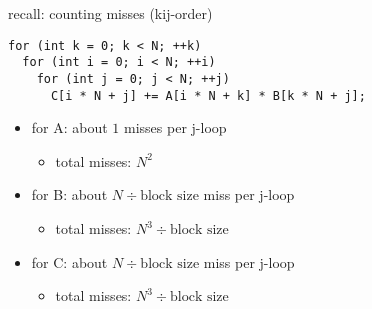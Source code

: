 
\begin{frame}[fragile,label=countingMissesKIJ]{recall: counting misses (kij-order)}
\lstset{style=smaller,language=C++}
\begin{lstlisting}
for (int k = 0; k < N; ++k)
  for (int i = 0; i < N; ++i)
    for (int j = 0; j < N; ++j)
      C[i * N + j] += A[i * N + k] * B[k * N + j];
\end{lstlisting}
\begin{itemize}
\item for A: about $1$ misses per j-loop
    \begin{itemize}
    \item total misses: $N^2$
    \end{itemize}
\item for B: about $N\div\text{block size}$ miss per j-loop
    \begin{itemize}
    \item total misses: $N^3\div\text{block size}$
    \end{itemize}
\item for C: about $N\div\text{block size}$ miss per j-loop
    \begin{itemize}
    \item total misses: $N^3\div\text{block size}$
    \end{itemize}
\end{itemize}
\end{frame}
